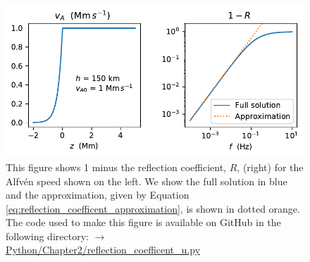 \begin{figure}
    \centering
    \vspace{-20pt}
    \includegraphics{figures/chapter02/reflection_coefficent.pdf}
    \vspace{-20pt}
    \caption{This figure shows 1 minus the reflection coefficient, $R$, (right) for the Alfv\'en speed shown on the left. We show the full solution in blue and the approximation, given by Equation \eqref{eq:reflection_coefficent_approximation}, is shown in dotted orange. The code used to make this figure is available on GitHub in the following directory:\newline
    \href{https://github.com/aleksyprok/apkp_thesis/blob/main/Python/Chapter2/reflection_coefficent_u.py}{$\rightarrow$ Python/Chapter2/reflection\_coefficent\_u.py}}
    \vspace{-10pt}
    \label{fig:reflection_coefficent}
\end{figure}

